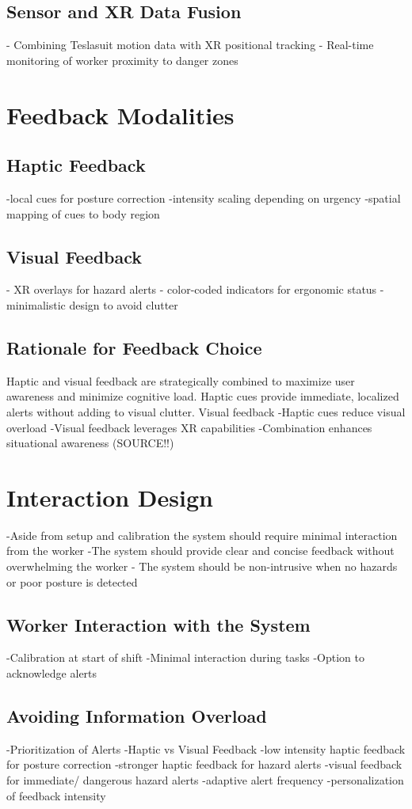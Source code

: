 \subsection{Sensor and XR Data Fusion}
- Combining Teslasuit motion data with XR positional tracking
- Real-time monitoring of worker proximity to danger zones


\section{Feedback Modalities}
\subsection{Haptic Feedback}
-local cues for posture correction
-intensity scaling depending on urgency
-spatial mapping of cues to body region
\subsection{Visual Feedback}
- XR overlays for hazard alerts
- color-coded indicators for ergonomic status
- minimalistic design to avoid clutter

\subsection{Rationale for Feedback Choice}
Haptic and visual feedback are strategically combined to maximize user awareness and minimize cognitive load. Haptic cues provide immediate, localized alerts without adding to visual clutter. Visual feedback 
-Haptic cues reduce visual overload
-Visual feedback leverages XR capabilities
-Combination enhances situational awareness (SOURCE!!)

\section{Interaction Design}
-Aside from setup and calibration the system should require minimal interaction from the worker
-The system should provide clear and concise feedback without overwhelming the worker
- The system should be non-intrusive when no hazards or poor posture is detected
\subsection{Worker Interaction with the System}
-Calibration at start of shift
-Minimal interaction during tasks
-Option to acknowledge alerts

\subsection{Avoiding Information Overload}
-Prioritization of Alerts
-Haptic vs Visual Feedback
-low intensity haptic feedback for posture correction
-stronger haptic feedback for hazard alerts
-visual feedback for immediate/ dangerous hazard alerts
-adaptive alert frequency 
-personalization of feedback intensity

